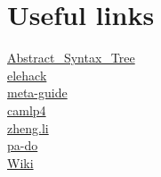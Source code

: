 
\section{Useful links}
  \href{http://brion.inria.fr/gallium/index.php/Abstract\_Syntax\_Tree}{Abstract\_Syntax\_Tree} \\
  \href{http://elehack.net/michael/blog/2010/06/ocaml-syntax-extension}{elehack} \\
  \href{http://andreiformiga.com/blog/?p=99}{meta-guide} \\
  \href{http://www.wisdomandwonder.com/link/5302/resources-for-learning-camlp4}{camlp4} \\
  \href{http://www.pps.jussieu.fr/~li/software/}{zheng.li}\\
  \href{http://alaska-kamtchatka.blogspot.com/2010/08/what-can-pado-for-you.html}{pa-do}\\

  \href{http://brion.inria.fr/gallium/index.php/Category:Camlp4}{Wiki}\\
  
